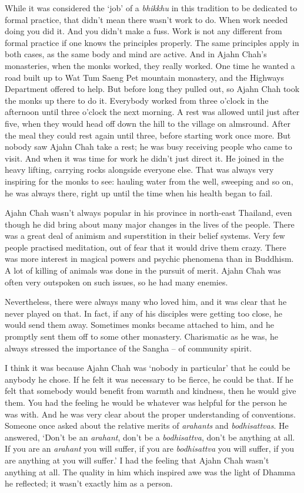 While it was considered the `job' of a \emph{bhikkhu} in this tradition
to be dedicated to formal practice, that didn't mean there wasn't work
to do. When work needed doing you did it. And you didn't make a fuss. 
Work is not any different from formal practice if one knows the
principles properly. The same principles apply in both cases, as the
same body and mind are active. And in Ajahn Chah's monasteries, when the
monks worked, they really worked. One time he wanted a road built up to
Wat Tum Saeng Pet mountain monastery, and the Highways Department
offered to help. But before long they pulled out, so Ajahn Chah took the
monks up there to do it. Everybody worked from three o'clock in the
afternoon until three o'clock the next morning. A rest was allowed until
just after five, when they would head off down the hill to the village
on almsround. After the meal they could rest again until three, before
starting work once more. But nobody saw Ajahn Chah take a rest; he was
busy receiving people who came to visit. And when it was time for work
he didn't just direct it. He joined in the heavy lifting, carrying rocks
alongside everyone else. That was always very inspiring for the monks to
see: hauling water from the well, sweeping and so on, he was always
there, right up until the time when his health began to fail. 

Ajahn Chah wasn't always popular in his province in north-east Thailand, 
even though he did bring about many major changes in the lives of the
people. There was a great deal of animism and superstition in their
belief systems. Very few people practised meditation, out of fear that
it would drive them crazy. There was more interest in magical powers and
psychic phenomena than in Buddhism. A lot of killing of animals was done
in the pursuit of merit. Ajahn Chah was often very outspoken on such
issues, so he had many enemies. 

Nevertheless, there were always many who loved him, and it was clear
that he never played on that. In fact, if any of his disciples were
getting too close, he would send them away. Sometimes monks became
attached to him, and he promptly sent them off to some other monastery. 
Charismatic as he was, he always stressed the importance of the Sangha
-- of community spirit. 

I think it was because Ajahn Chah was `nobody in particular' that he
could be anybody he chose. If he felt it was necessary to be fierce, he
could be that. If he felt that somebody would benefit from warmth and
kindness, then he would give them. You had the feeling he would be
whatever was helpful for the person he was with. And he was very clear
about the proper understanding of conventions. Someone once asked about
the relative merits of \emph{arahants} and \emph{bodhisattvas}. He
answered, `Don't be an \emph{arahant}, don't be a \emph{bodhisattva}, 
don't be anything at all. If you are an \emph{arahant} you will suffer, 
if you are \emph{bodhisattva} you will suffer, if you are anything at
you will suffer.' I had the feeling that Ajahn Chah wasn't anything at
all. The quality in him which inspired awe was the light of Dhamma he
reflected; it wasn't exactly him as a person. 


